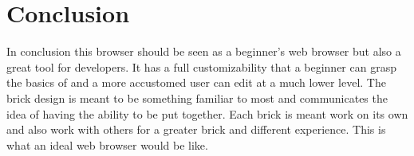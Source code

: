 \documentclass[11pt]{article}
\begin{document}
\section{Conclusion}
In conclusion this browser should be seen as a beginner’s web browser but also a great tool for developers. It has a full customizability that a beginner can grasp the basics of and a more accustomed user can edit at a much lower level. The brick design is meant to be something familiar to most and communicates the idea of having the ability to be put together. Each brick is meant work on its own and also work with others for a greater brick and different experience. This is what an ideal web browser would be like.
%
\end{document}
